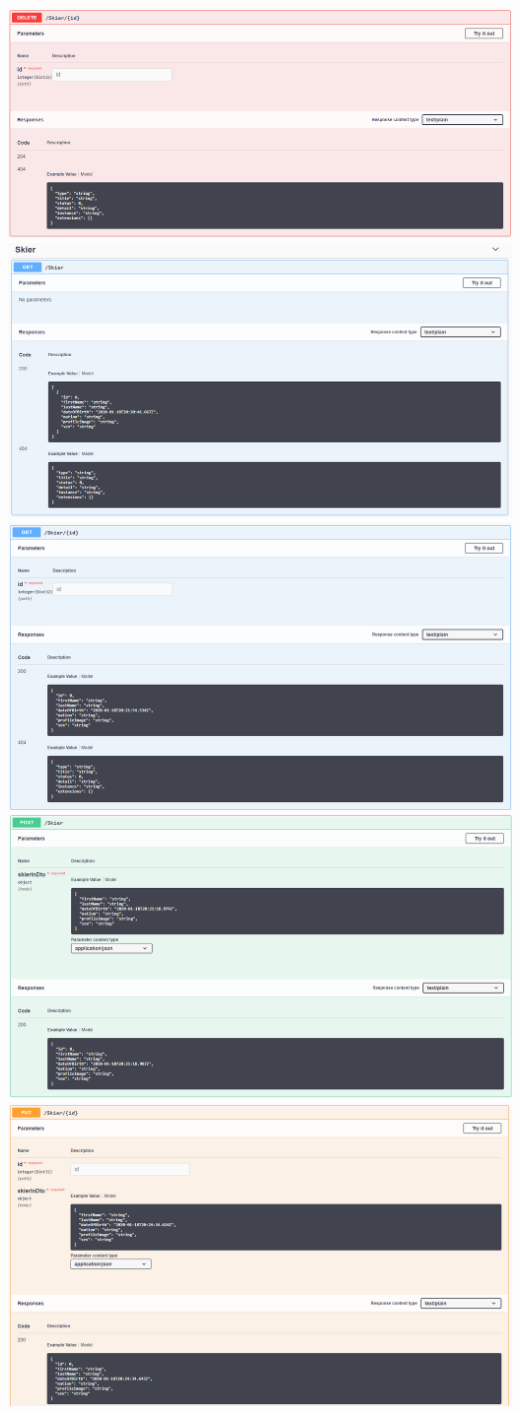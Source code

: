 \documentclass[a4paper, 12pt]{article}
\begin{document}
	\newline	
	\includegraphics[width=.7\textwidth]{img/Controller_skier_delete.png}
	\newline	
	\includegraphics[width=.7\textwidth]{img/Controller_skier_get_all.png}
	\newline	
	\includegraphics[width=.7\textwidth]{img/Controller_skier_get_byId.png}
	\newline	
	\includegraphics[width=.7\textwidth]{img/Controller_skier_post.png}
	\newline	
	\includegraphics[width=.7\textwidth]{img/Controller_skier_put_1.png}
\end{document}
